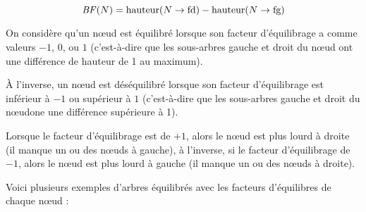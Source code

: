 \documentclass[11pt,a4paper,twoside]{article}
\begin{document}
\begin{equation*}
\text{\textit{BF}}(N) = \text{hauteur}(N\rightarrow\text{fd}) - \text{hauteur}(N\rightarrow\text{fg})
\end{equation*}

\bigskip

On considère qu'un nœud est équilibré lorsque son facteur d'équilibrage a comme valeurs $ -1 $, $ 0 $, ou $ 1 $ (c'est-à-dire que les sous-arbres gauche et droit du nœud ont une différence de hauteur de 1 au maximum).

À l'inverse, un nœud est déséquilibré lorsque son facteur d'équilibrage est inférieur à $ -1 $ ou supérieur à $ 1 $ (c'est-à-dire que les sous-arbres gauche et droit du nœudone une différence supérieure à 1).

\bigskip

Lorsque le facteur d'équilibrage est de $ +1 $, alors le nœud est plus lourd à droite (il manque un ou des nœuds à gauche), à l'inverse, si le facteur d'équilibrage de $ -1 $, alors le nœud est plus lourd à gauche (il manque un ou des nœuds à droite).

\bigskip

Voici plusieurs exemples d'arbres équilibrés avec les facteurs d'équilibres de chaque nœud :

\medskip

\vfillFirst
\end{document}
